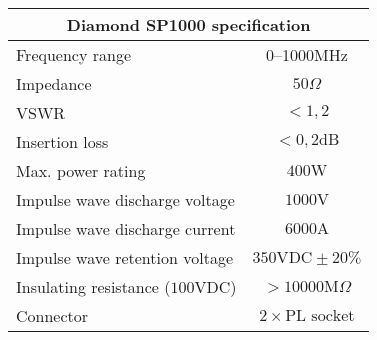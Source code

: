\footnotesize
\begin{tabular}{|l|c|}
	\hline
	\multicolumn{2}{|c|}{\textbf{Diamond SP1000 specification}} \\
	\hline
 	Frequency range & \numrange{0}{1000}$\mathrm{MHz}$ \\ %
 	Impedance & $50\Omega$ \\
 	VSWR & $< 1,2$ \\
	Insertion loss & $< 0,2\mathrm{dB}$ \\
 	Max. power rating & $400\mathrm{W}$ \\
	Impulse wave discharge voltage & $1000\mathrm{V}$ \\
	Impulse wave discharge current & $6000\mathrm{A}$ \\
	Impulse wave retention voltage & $350\mathrm{VDC} \pm 20\%$ \\
	Insulating resistance ($100\mathrm{VDC}$) & $> 10000\mathrm{M}\Omega$ \\
	Connector & $2 \times \text{PL socket}$ \\
	\hline
\end{tabular}
